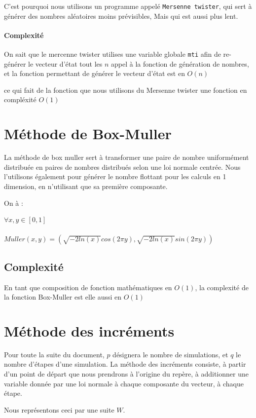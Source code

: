 \documentclass[10pt,a4paper]{article}
\begin{document}
C'est pourquoi nous utilisons un programme appelé \texttt{Mersenne twister}, qui sert à générer des nombres aléatoires 
moins prévisibles, Mais qui est aussi plus lent.

\paragraph{Complexité}
On sait que le mercenne twister utilises une variable globale \texttt{mti} afin de re-générer le vecteur d'état tout les $n$
 appel à la fonction de génération de nombres, et la fonction permettant de générer le vecteur d'état est en $O(n)$
 
 ce qui fait de la fonction que nous utilisons du Mersenne twister une fonction en compléxité $O(1)$
\section{Méthode de Box-Muller}
La méthode de box muller sert à transformer une paire de nombre uniformément distribuée en paires de nombres distribués selon une loi normale centrée.
Nous l'utilisons également pour générer le nombre flottant pour les calculs en 1 dimension,
en n'utilisant que sa première composante.

On à :

$\forall x, y\in[0, 1]$\\\\
$Muller(x, y) = (\sqrt{-2ln(x)} cos(2\pi y), \sqrt{-2ln(x)} sin(2\pi y))$

\subsection{Complexité}
En tant que composition de fonction mathématiques en $O(1)$, la complexité de la fonction Box-Muller est elle aussi en $O(1)$

\section{Méthode des incréments}

Pour toute la suite du document, $p$ désignera le nombre de simulations, et $q$ le nombre d'étapes d'une simulation.
La méthode des incréments consiste, à partir d'un point de départ que nous prendrons à l'origine du repère, à additionner 
une variable donnée par une loi normale à chaque composante du vecteur, à chaque étape.

Nous représentons ceci par une suite $W$.
\end{document}
